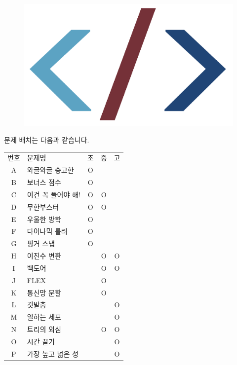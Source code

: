 \documentclass[11pt,a4paper,oneside,korean]{article}
\begin{document}
    \begin{figure}[h]
        \centering
        \includegraphics[height=0.12\textheight]{./logo-cropped.png}
    \end{figure}
    
    문제 배치는 다음과 같습니다.
    {
    \begin{table}[h]
        \centering
        \sffamily\large
        \renewcommand{\arraystretch}{1.2}
            \begin{tabular}{c|l|c|c|c}
            번호 & 문제명 & 초 & 중 & 고 \\
            A & 와글와글 숭고한 & O & & \\
            B & 보너스 점수 & O & & \\
            C & 이건 꼭 풀어야 해! & O & O & \\
            D & 무한부스터 & O & O & \\
            E & 우울한 방학 & O & & \\
            F & 다이나믹 롤러 & O & & \\
            G & 핑거 스냅 & O & & \\
            H & 이진수 변환 & & O & O \\
            I & 백도어 & & O & O \\
            J & FLEX & & O & \\
            K & 통신망 분할 & & O & \\
            L & 깃발춤 & & & O \\
            M & 일하는 세포 & & & O \\
            N & 트리의 외심 & & O & O \\
            O & 시간 끌기 & & & O \\
            P & 가장 높고 넓은 성 & & & O \\      
            \end{tabular}
        \end{table}
    }
\end{document}
